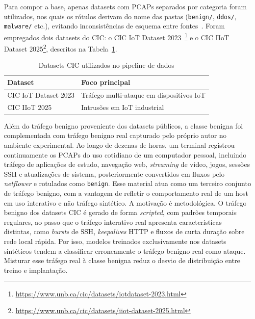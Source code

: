 \documentclass[12pt]{article}
\begin{document}
Para compor a base, apenas datasets com PCAPs separados por categoria foram
utilizados, nos quais os rótulos derivam do nome das pastas (\texttt{benign/},
\texttt{ddos/}, \texttt{malware/} etc.), evitando inconsistências de esquema
entre fontes~\cite{sharafaldin:18}. Foram empregados dois datasets do
CIC: o CIC IoT Dataset
2023~\cite{neto:23}\footnote{\url{https://www.unb.ca/cic/datasets/iotdataset-2023.html}} e o
CIC IIoT Dataset 2025\footnote{\url{https://www.unb.ca/cic/datasets/iiot-dataset-2025.html}},
descritos na Tabela~\ref{tab:datasets}.

\begin{table}[ht]
\centering
\caption{Datasets CIC utilizados no pipeline de dados}
\label{tab:datasets}
\begin{tabular}{@{}ll@{}}
\toprule
\textbf{Dataset} & \textbf{Foco principal} \\ \midrule
CIC IoT Dataset 2023 & Tráfego multi-ataque em dispositivos IoT \\
CIC IIoT 2025        & Intrusões em IoT industrial \\
\bottomrule
\end{tabular}
\end{table}

Além do tráfego benigno proveniente dos datasets públicos, a classe benigna foi
complementada com tráfego benigno real capturado pelo próprio autor no ambiente experimental. Ao
longo de dezenas de horas, um terminal registrou continuamente os PCAPs do uso cotidiano de um computador pessoal, incluindo tráfego de aplicações de estudo, navegação web, \textit{streaming} de vídeo, jogos, sessões SSH e atualizações de sistema, posteriormente convertidos
em fluxos pelo \textit{netflower} e rotulados como \texttt{benign}. Esse material atua como um terceiro conjunto de tráfego benigno, com a vantagem de
refletir o comportamento real de um host em uso interativo e não tráfego sintético. A motivação é metodológica. O tráfego benigno dos datasets CIC é
gerado de forma \textit{scripted}, com padrões temporais regulares, ao passo que o
tráfego interativo real apresenta características distintas, como \textit{bursts} de SSH, \textit{keepalives} HTTP e fluxos de curta duração sobre rede local rápida. Por isso, modelos treinados exclusivamente nos datasets sintéticos tendem a classificar
erroneamente o tráfego benigno real como ataque. Misturar esse tráfego real à classe benigna reduz o desvio de distribuição entre treino e implantação.
\end{document}
